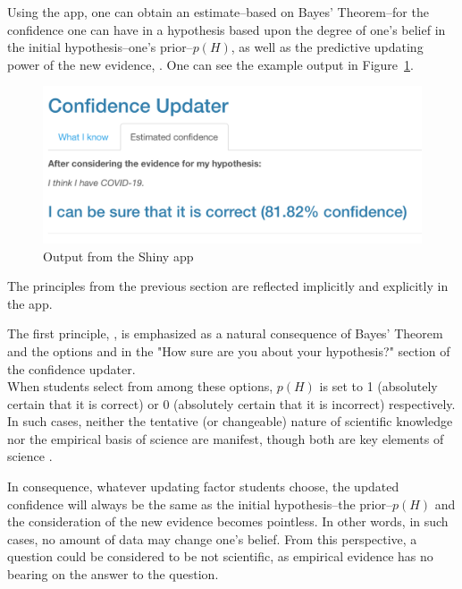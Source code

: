 \documentclass[man, floatsintext]{apa7} %
\begin{document}
Using the app, one can obtain an estimate--based on Bayes' Theorem--for the confidence one can have in a hypothesis based upon the degree of one's belief in the initial hypothesis--one's prior--$p(H)$, as well as the predictive updating power of the new evidence, . One can see the example output in Figure~\ref{fig:confidence-updater-output}.

\begin{figure}[h]
\begin{center}
\includegraphics[width = .785\paperwidth]{confidence-updater-output.png}
\caption{Output from the Shiny app}
\label{fig:confidence-updater-output}
\end{center}
\end{figure}

The principles from the previous section are reflected implicitly and explicitly in the app.

The first principle, , is emphasized as a natural consequence of Bayes' Theorem and the options  and  in the "How sure are you about your hypothesis?" section of the confidence updater. \\ When students select from among these options, $p(H)$ is set to 1 (absolutely certain that it is correct) or 0 (absolutely certain that it is incorrect) respectively. In such cases, neither the tentative (or changeable) nature of scientific knowledge nor the empirical basis of science are manifest, though both are key elements of science \parencite{abd1998nature}.

In consequence, whatever updating factor  students choose, the updated confidence will always be the same as the initial hypothesis--the prior--$p(H)$ and the consideration of the new evidence becomes pointless. In other words, in such cases, no amount of data may change one's belief. From this perspective, a question could be considered to be not scientific, as empirical evidence has no bearing on the answer to the question. \\
\end{document}
